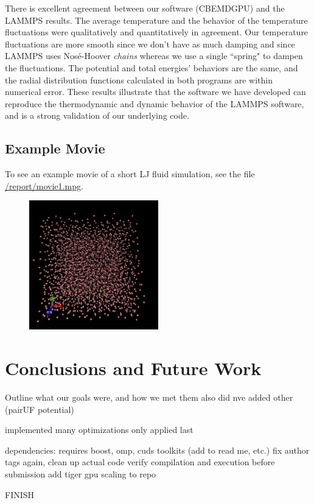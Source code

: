 \documentclass[12pt]{article}
\begin{document}
There is excellent agreement between our software (CBEMDGPU) and the LAMMPS results. The average temperature and the behavior of the temperature fluctuations were qualitatively and quantitatively in agreement. Our temperature fluctuations are more smooth since we don't have as much damping and since LAMMPS uses Nos\'{e}-Hoover \emph{chains} whereas we use a single ``spring" to dampen the fluctuations. The potential and total energies' behaviors are the same, and the radial distribution functions calculated in both programs are within numerical error. These results illustrate that the software we have developed can reproduce the thermodynamic and dynamic behavior of the LAMMPS software, and is a strong validation of our underlying code.

\subsection{Example Movie}
To see an example movie of a short LJ fluid simulation, see the file \url{/report/movie1.mpg}.
\begin{figure}[H]
	\begin{center}
    	\includegraphics[width=0.5\textwidth]{vmd_image.png}
	\end{center}
\end{figure}
\section{Conclusions and Future Work}

Outline what our goals were, and how we met them
also did nve
added other (pairUF potential)

implemented many optimizations only applied last

dependencies: requires boost, omp, cuds toolkits (add to read me, etc.)
fix author tags again, clean up actual code
verify compilation and execution before submission
add tiger gpu scaling to repo

FINISH

\pagebreak


\end{document}
